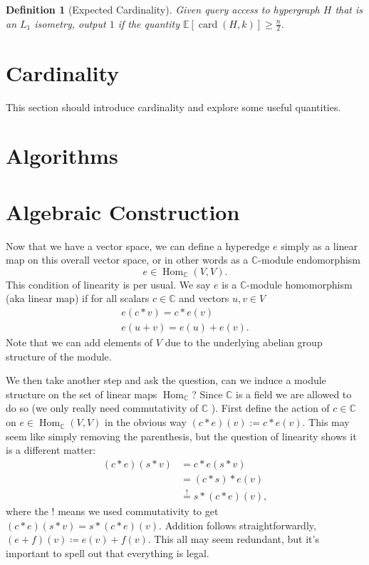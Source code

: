 \documentclass{article}
\newcommand{\parens}[1]{\left( #1 \right)}
\newcommand{\brackets}[1]{\left[ #1 \right]}
\newcommand{\expect}[1]{\mathbb{E}\brackets{#1}}
\newcommand{\field}{\mathbb{C}}
\DeclareMathOperator{\Hom}{Hom}
\DeclareMathOperator{\card}{card}
\newcommand{\cardi}[1]{\card \parens{ #1 }}
\newtheorem{defn}{Definition}
\begin{document}
\begin{defn}[Expected Cardinality]
    Given query access to hypergraph $H$ that is an $L_1$ isometry, output $1$ if the quantity $\expect{\cardi{H,k}} \geq \frac{n}{2}$.
\end{defn}

\section{Cardinality} \label{sec:cardinality}
This section should introduce cardinality and explore some useful quantities.

\section{Algorithms} \label{sec:algorithms}

\section{Algebraic Construction}
Now that we have a vector space, we can define a hyperedge $e$ simply as a linear map on this overall vector space, or in other words as a $\field$-module endomorphism
\begin{equation}
    e \in \Hom_{\field} (V, V).
\end{equation}
This condition of linearity is per usual. We say $e$ is a $\field$-module homomorphism (aka linear map) if for all scalars $c \in \field$ and vectors $u, v \in V$
\begin{align}
    e(c * v) = c * e(v) \\
    e (u + v) = e(u) + e(v).
\end{align}
Note that we can add elements of $V$ due to the underlying abelian group structure of the module. 

We then take another step and ask the question, can we induce a module structure on the set of linear maps $\Hom_{\field}$? Since $\field$ is a field we are allowed to do so (we only really need commutativity of $\field$ ). First define the action of $c \in \field$ on $e \in \Hom_\field(V, V)$ in the obvious way $(c * e) (v) := c * e(v)$. This may seem like simply removing the parenthesis, but the question of linearity shows it is a different matter:
\begin{align}
    (c * e) (s * v) &= c * e( s * v) \\
    &= (c * s) * e(v) \\
    &\overset{!}{=} s * (c * e) (v),
\end{align}
where the ! means we used commutativity to get $(c *e) (s * v) = s * (c * e) (v)$. Addition follows straightforwardly, $(e+f) (v) \coloneqq e(v) + f(v)$. This all may seem redundant, but it's important to spell out that everything is legal.
\end{document}
